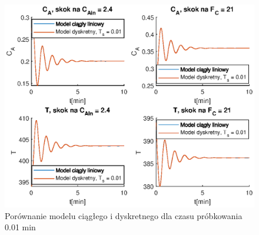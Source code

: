 \begin{figure}
\centering
\includegraphics[width=.8\linewidth]{plot/dysk_01.eps}
\caption{Porównanie modelu ciągłego i dyskretnego dla czasu próbkowania 0.01 min}
\label{fig:dys001}
\end{figure}
